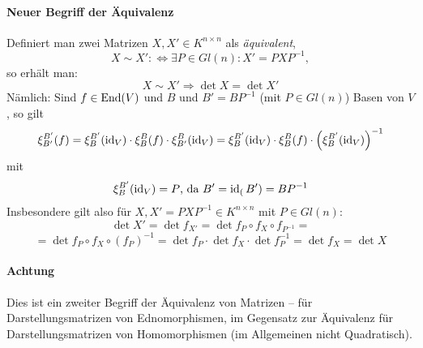 \paragraph{Neuer Begriff der Äquivalenz}
	Definiert man zwei Matrizen $ X,X' \in K^{n\times n}$ als \emph{äquivalent},
		\[ X\sim X' :\Leftrightarrow \exists P\in Gl(n): X' =PXP^{-1}, \]
	so erhält man:
		\[ X\sim X' \Rightarrow \det X = \det X' \]
	Nämlich: Sind $ f\in \operatorname{End}(V) $ und $ B $ und $ B'=BP^{-1} $ (mit $ P\in Gl(n) $) Basen von $ V $, so gilt
		\[ \xi_{B'}^{B'}(f) = \xi_{B}^{B'}(\operatorname{id}_V)\cdot \xi_B^B(f)\cdot \xi_{B'}^{B}(\operatorname{id}_V) =
		\xi_{B}^{B'}(\operatorname{id}_V)\cdot \xi_B^B(f)\cdot \left(\xi^{B'}_{B}(\operatorname{id}_V)\right)^{-1} \]
	mit
		\[ \xi_B^{B'}(\operatorname{id}_V) = P \text{, da } B' = \operatorname{id}_(B') = BP^{-1} \]
	Insbesondere gilt also für $ X,X' = PXP^{-1}\in K^{n\times n} $ mit $ P\in Gl(n) $:
		\[ \det X' = \det f_{X'} = \det f_P \circ f_X \circ f_{P^{-1}} =\]
		\[=\det f_P \circ f_X \circ (f_P)^{-1} = \det f_P \cdot \det f_X \cdot \det f_P^{-1} = \det f_X = \det X\]
\paragraph{Achtung}
	Dies ist ein zweiter Begriff der Äquivalenz von Matrizen -- für Darstellungsmatrizen von Ednomorphismen, im Gegensatz zur Äquivalenz für Darstellungsmatrizen von Homomorphismen (im Allgemeinen nicht Quadratisch).